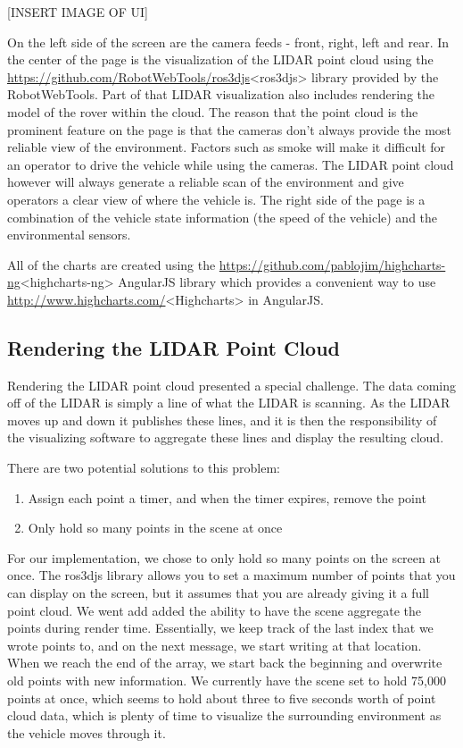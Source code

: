 [INSERT IMAGE OF UI]

On the left side of the screen are the camera feeds - front, right, left and rear.  In the center of the page is the visualization of the LIDAR point cloud using the \url{https://github.com/RobotWebTools/ros3djs}<ros3djs> library provided by the RobotWebTools.  Part of that LIDAR visualization also includes rendering the model of the rover within the cloud.  The reason that the point cloud is the prominent feature on the page is that the cameras don't always provide the most reliable view of the environment.  Factors such as smoke will make it difficult for an operator to drive the vehicle while using the cameras.  The LIDAR point cloud however will always generate a reliable scan of the environment and give operators a clear view of where the vehicle is.  The right side of the page is a combination of the vehicle state information (the speed of the vehicle) and the environmental sensors.

All of the charts are created using the \url{https://github.com/pablojim/highcharts-ng}<highcharts-ng> AngularJS library which provides a convenient way to use \url{http://www.highcharts.com/}<Highcharts> in AngularJS.

\subsection{Rendering the LIDAR Point Cloud}
Rendering the LIDAR point cloud presented a special challenge.  The data coming off of the LIDAR is simply a line of what the LIDAR is scanning.  As the LIDAR moves up and down it publishes these lines, and it is then the responsibility of the visualizing software to aggregate these lines and display the resulting cloud.

There are two potential solutions to this problem:
\begin{enumerate}
    \item Assign each point a timer, and when the timer expires, remove the point
    \item Only hold so many points in the scene at once
\end{enumerate}

For our implementation, we chose to only hold so many points on the screen at once.  The ros3djs library allows you to set a maximum number of points that you can display on the screen, but it assumes that you are already giving it a full point cloud.  We went add added the ability to have the scene aggregate the points during render time.  Essentially, we keep track of the last index that we wrote points to, and on the next message, we start writing at that location.  When we reach the end of the array, we start back the beginning and overwrite old points with new information.  We currently have the scene set to hold 75,000 points at once, which seems to hold about three to five seconds worth of point cloud data, which is plenty of time to visualize the surrounding environment as the vehicle moves through it.

